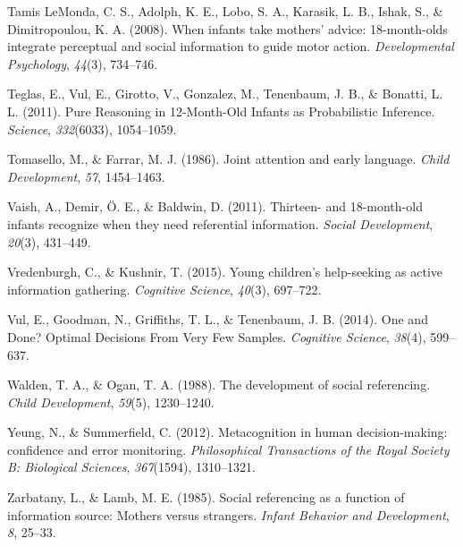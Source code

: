 \documentclass[a4paper,man,apacite,floatsintext]{apa6}
\begin{document}
\hypertarget{ref-TamisLeMonda2008}{}
Tamis LeMonda, C. S., Adolph, K. E., Lobo, S. A., Karasik, L. B., Ishak,
S., \& Dimitropoulou, K. A. (2008). When infants take mothers' advice:
18-month-olds integrate perceptual and social information to guide motor
action. \emph{Developmental Psychology}, \emph{44}(3), 734--746.

\hypertarget{ref-Teglas2011}{}
Teglas, E., Vul, E., Girotto, V., Gonzalez, M., Tenenbaum, J. B., \&
Bonatti, L. L. (2011). Pure Reasoning in 12-Month-Old Infants as
Probabilistic Inference. \emph{Science}, \emph{332}(6033), 1054--1059.

\hypertarget{ref-Tomasello1986}{}
Tomasello, M., \& Farrar, M. J. (1986). Joint attention and early
language. \emph{Child Development}, \emph{57}, 1454--1463.

\hypertarget{ref-Vaish2011}{}
Vaish, A., Demir, Ö. E., \& Baldwin, D. (2011). Thirteen- and
18-month-old infants recognize when they need referential information.
\emph{Social Development}, \emph{20}(3), 431--449.

\hypertarget{ref-Vredenburgh2015}{}
Vredenburgh, C., \& Kushnir, T. (2015). Young children's help-seeking as
active information gathering. \emph{Cognitive Science}, \emph{40}(3),
697--722.

\hypertarget{ref-Vul2014}{}
Vul, E., Goodman, N., Griffiths, T. L., \& Tenenbaum, J. B. (2014). One
and Done? Optimal Decisions From Very Few Samples. \emph{Cognitive
Science}, \emph{38}(4), 599--637.

\hypertarget{ref-Walden1988}{}
Walden, T. A., \& Ogan, T. A. (1988). The development of social
referencing. \emph{Child Development}, \emph{59}(5), 1230--1240.

\hypertarget{ref-Yeung2012}{}
Yeung, N., \& Summerfield, C. (2012). Metacognition in human
decision-making: confidence and error monitoring. \emph{Philosophical
Transactions of the Royal Society B: Biological Sciences},
\emph{367}(1594), 1310--1321.

\hypertarget{ref-Zarbatany1985}{}
Zarbatany, L., \& Lamb, M. E. (1985). Social referencing as a function
of information source: Mothers versus strangers. \emph{Infant Behavior
and Development}, \emph{8}, 25--33.


\end{document}

